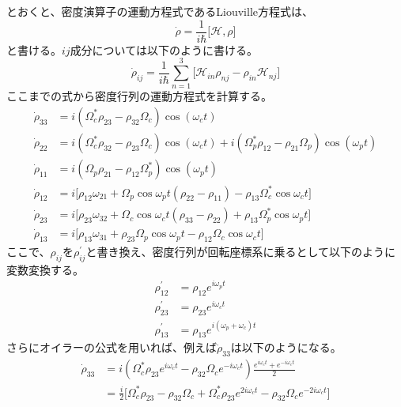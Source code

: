\documentclass[dvipdfmx]{jsarticle}
\begin{document}
とおくと、密度演算子の運動方程式であるLiouville方程式は、
\begin{equation}
\dot{\rho} = \frac{1}{i\hbar} \lbrack \mathcal{H}, \rho \rbrack
\end{equation}
と書ける。$ij$成分については以下のように書ける。
\begin{equation}
\dot{\rho}_{ij} = \frac{1}{i\hbar} \sum_{n=1}^3 \lbrack \mathcal{H}_{in} \rho_{nj} - \rho_{in}\mathcal{H}_{nj} \rbrack
\end{equation}
ここまでの式から密度行列の運動方程式を計算する。
\begin{align}
{\dot{\rho}_{33}} &= i\left( \Omega_c^* {\rho_{23}} - {\rho_{32}}\Omega_c \right) \cos{(\omega_c t)} \\
{\dot{\rho}_{22}} &= i\left( \Omega_c^* {\rho_{32}} - {\rho_{23}}\Omega_c \right) \cos{(\omega_c t)} + i\left( \Omega_p^* {\rho_{12}} - {\rho_{21}}\Omega_p \right) \cos{(\omega_p t)} \\
{\dot{\rho}_{11}} &= i\left( \Omega_p {\rho_{21}} - {\rho_{12}}\Omega_p^* \right) \cos{(\omega_p t)} \\
{\dot{\rho}_{12}} &= i\lbrack {\rho_{12}}\omega_{21} + \Omega_p \cos{\omega_p t} ({\rho_{22}} - {\rho_{11}}) - {\rho_{13}} \Omega_c^* \cos{\omega_c t} \rbrack \\
{\dot{\rho}_{23}} &= i\lbrack {\rho_{23}}\omega_{32} + \Omega_c \cos{\omega_c t} ({\rho_{33}} - {\rho_{22}}) + {\rho_{13}} \Omega_p^* \cos{\omega_p t} \rbrack \\
{\dot{\rho}_{13}} &= i\lbrack {\rho_{13}}\omega_{31} + {\rho_{23}}\Omega_p \cos{\omega_p t} - {\rho_{12}}\Omega_c \cos{\omega_c t}  \rbrack
\end{align}
ここで、${\rho_{ij}}$を${\rho_{ij}^{'}}$と書き換え、密度行列が回転座標系に乗るとして以下のように変数変換する。
\begin{equation}
\begin{split}
{\rho_{12}^{'}} &= \rho_{12}e^{i\omega_p t} \\
{\rho_{23}^{'}} &= \rho_{23}e^{i\omega_c t} \\
{\rho_{13}^{'}} &= \rho_{13}e^{i(\omega_p + \omega_c) t} 
\end{split}
\end{equation}
さらにオイラーの公式を用いれば、例えば${\dot{\rho}_{33}}$は以下のようになる。
\begin{equation}
\begin{split}
    \dot{\rho}_{33} &= i\left( \Omega_c^* {\rho_{23} e^{i\omega_c t}} - {\rho_{32}}\Omega_c e^{-i\omega_c t} \right) \frac{e^{i\omega_c t} + e^{-i\omega_c t}}{2} \\
    &= \frac{i}{2} \lbrack \Omega_c^* {\rho_{23}} -  {\rho_{32}}\Omega_c + \Omega_c^* {\rho_{23}e^{2i\omega_c t}} - {\rho_{32}}\Omega_c e^{-2i\omega_c t} \rbrack
\end{split}
\end{equation}
\end{document}
